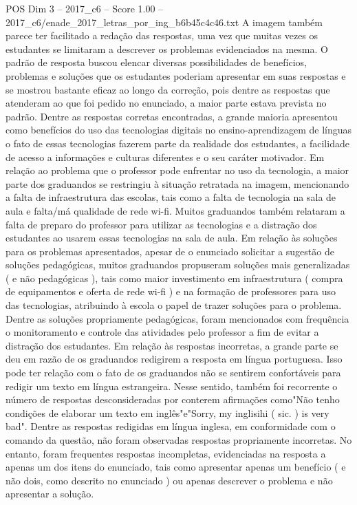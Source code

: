 \begin{textsample}{POS Dim 3 – 2017\_c6 – Score 1.00 – 2017\_c6/enade\_2017\_letras\_por\_ing\_b6b45c4c46.txt}
A imagem também parece ter facilitado a redação das respostas, uma vez que muitas vezes os estudantes se limitaram a descrever os problemas evidenciados na mesma.
O padrão de resposta buscou elencar diversas possibilidades de benefícios, problemas e soluções que os estudantes poderiam apresentar em suas respostas e se mostrou bastante eficaz ao longo da correção, pois dentre as respostas que atenderam ao que foi pedido no enunciado, a maior parte estava prevista no padrão.
Dentre as respostas corretas encontradas, a grande maioria apresentou como benefícios do uso das tecnologias digitais no ensino-aprendizagem de línguas o fato de essas tecnologias fazerem parte da realidade dos estudantes, a facilidade de acesso a informações e culturas diferentes e o seu caráter motivador.
Em relação ao problema que o professor pode enfrentar no uso da tecnologia, a maior parte dos graduandos se restringiu à situação retratada na imagem, mencionando a falta de infraestrutura das escolas, tais como a falta de tecnologia na sala de aula e falta/má qualidade de rede wi-fi.
Muitos graduandos também relataram a falta de preparo do professor para utilizar as tecnologias e a distração dos estudantes ao usarem essas tecnologias na sala de aula.
Em relação às soluções para os problemas apresentados, apesar de o enunciado solicitar a sugestão de soluções pedagógicas, muitos graduandos propuseram soluções mais generalizadas ( e não pedagógicas ), tais como maior investimento em infraestrutura ( compra de equipamentos e oferta de rede wi-fi ) e na formação de professores para uso das tecnologias, atribuindo à escola o papel de trazer soluções para o problema.
Dentre as soluções propriamente pedagógicas, foram mencionados com frequência o monitoramento e controle das atividades pelo professor a fim de evitar a distração dos estudantes.
Em relação às respostas incorretas, a grande parte se deu em razão de os graduandos redigirem a resposta em língua portuguesa.
Isso pode ter relação com o fato de os graduandos não se sentirem confortáveis para redigir um texto em língua estrangeira.
Nesse sentido, também foi recorrente o número de respostas desconsideradas por conterem afirmações como"Não tenho condições de elaborar um texto em inglês"e"Sorry, my inglisihi ( sic. ) is very bad".
Dentre as respostas redigidas em língua inglesa, em conformidade com o comando da questão, não foram observadas respostas propriamente incorretas.
No entanto, foram frequentes respostas incompletas, evidenciadas na resposta a apenas um dos itens do enunciado, tais como apresentar apenas um benefício ( e não dois, como descrito no enunciado ) ou apenas descrever o problema e não apresentar a solução.

\end{textsample}
